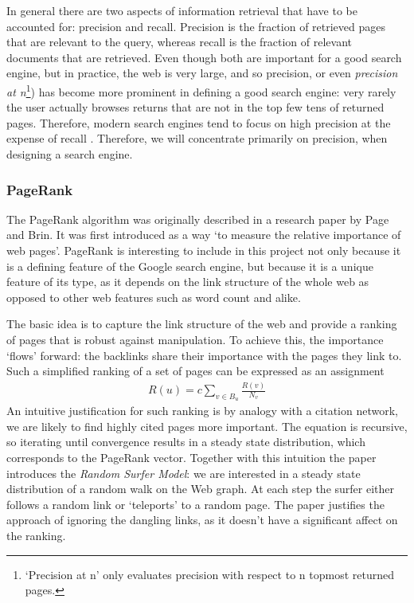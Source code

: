\documentclass[11pt,twoside,notitlepage]{report}
\begin{document}
In general there are two aspects of information retrieval that have to be
accounted for: precision and recall. Precision is the fraction of retrieved pages that
are relevant to the query, whereas recall is the fraction of relevant
documents that are retrieved. Even though both are important for a good search
engine, but in practice, the web is very large, and so precision, or even
\textit{precision at n}\footnote{`Precision at n' only evaluates precision with respect to
n topmost returned pages.}) has become
more prominent in defining a good search engine: very rarely the user actually
browses returns that are not in the top few tens of returned pages. Therefore, 
modern search engines tend to focus on high precision at the expense of recall
\cite{GOOGLE}. Therefore, we will concentrate primarily on precision, when
designing a search engine.

\subsubsection*{PageRank}
The PageRank algorithm was originally described in a research paper
by Page and Brin\cite{PageRank}. It was first introduced as a way `to measure
the relative importance of web pages'. PageRank is interesting to include in
this project not only because it is a defining feature of the Google search
engine, but because it is a unique feature of its type, as it depends on the link
structure of the whole web as opposed to other  web features such as word count
and alike.

The basic idea is to capture the link structure of the web and provide a
ranking of pages that is robust against manipulation. To achieve this, the
importance `flows' forward: the backlinks share their importance with the pages
they link to. Such a simplified ranking of a set of pages can be expressed as an assignment
\begin{gather}
  R(u)=c\sum_{v\in B_u}\frac{R(v)}{N_v}
\end{gather}
An intuitive justification for such ranking is by analogy with a citation
network, we are likely to find highly cited pages more important.
The equation is recursive, so iterating until convergence results in a steady
state distribution, which corresponds to the PageRank vector.
Together with this intuition the paper introduces the \textit{Random Surfer
Model}: we are interested in a steady state distribution of a random walk on
the Web graph. At each step the surfer either follows a random link or
`teleports' to a random page. The paper justifies the approach of ignoring the
dangling links, as it doesn't have a significant affect on the ranking. 
\end{document}
